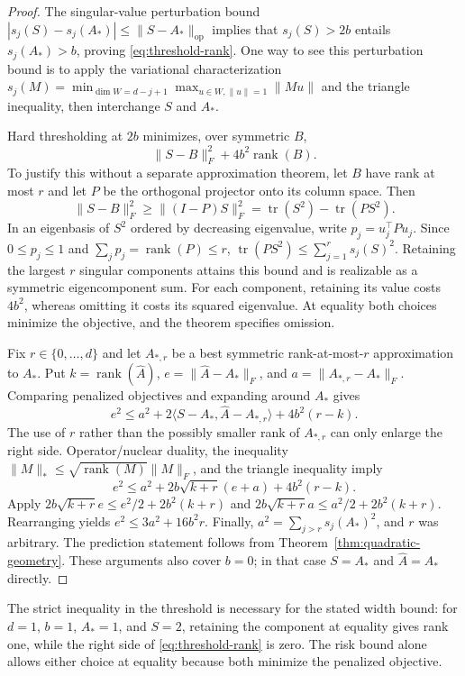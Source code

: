 \begin{proof}
The singular-value perturbation bound
$|s_j(S)-s_j(A_*)|\leq\|S-A_*\|_{\mathrm{op}}$ implies that
$s_j(S)>2b$ entails $s_j(A_*)>b$, proving
\eqref{eq:threshold-rank}. One way to see this perturbation bound is to
apply the variational characterization
$s_j(M)=\min_{\dim W=d-j+1}\max_{u\in W,\|u\|=1}\|Mu\|$
and the triangle inequality, then interchange $S$ and $A_*$.

Hard thresholding at $2b$ minimizes, over symmetric $B$,
\[
 \|S-B\|_F^2+4b^2\operatorname{rank}(B).
\]
To justify this without a separate approximation theorem, let $B$ have
rank at most $r$ and let $P$ be the orthogonal projector onto its column
space. Then
\[
 \|S-B\|_F^2\geq\|(I-P)S\|_F^2
 =\operatorname{tr}(S^2)-\operatorname{tr}(PS^2).
\]
In an eigenbasis of $S^2$ ordered by decreasing eigenvalue, write
$p_j=u_j^\top Pu_j$. Since $0\leq p_j\leq1$ and
$\sum_jp_j=\operatorname{rank}(P)\leq r$,
$\operatorname{tr}(PS^2)\leq\sum_{j=1}^r s_j(S)^2$.
Retaining the largest $r$ singular components attains this bound and is
realizable as a symmetric eigencomponent sum. For each component,
retaining its value costs $4b^2$, whereas omitting it costs its squared
eigenvalue. At equality both choices minimize the objective, and the
theorem specifies omission.

Fix $r\in\{0,\ldots,d\}$ and let $A_{*,r}$ be a best symmetric
rank-at-most-$r$ approximation to $A_*$. Put
$k=\operatorname{rank}(\widehat A)$,
$e=\|\widehat A-A_*\|_F$, and
$a=\|A_{*,r}-A_*\|_F$. Comparing penalized objectives and expanding
around $A_*$ gives
\[
 e^2\leq a^2+2\langle S-A_*,\widehat A-A_{*,r}\rangle
                  +4b^2(r-k).
\]
The use of $r$ rather than the possibly smaller rank of $A_{*,r}$ can
only enlarge the right side. Operator/nuclear duality, the inequality
$\|M\|_*\leq\sqrt{\operatorname{rank}(M)}\|M\|_F$, and the triangle
inequality imply
\[
 e^2\leq a^2+2b\sqrt{k+r}(e+a)+4b^2(r-k).
\]
Apply $2b\sqrt{k+r}e\leq e^2/2+2b^2(k+r)$ and
$2b\sqrt{k+r}a\leq a^2/2+2b^2(k+r)$. Rearranging yields
$e^2\leq3a^2+16b^2r$. Finally,
$a^2=\sum_{j>r}s_j(A_*)^2$, and $r$ was arbitrary.
The prediction statement follows from
Theorem~\ref{thm:quadratic-geometry}. These arguments also cover $b=0$;
in that case $S=A_*$ and $\widehat A=A_*$ directly.
\end{proof}

The strict inequality in the threshold is necessary for the stated
width bound: for $d=1$, $b=1$, $A_*=1$, and $S=2$, retaining the component
at equality gives rank one, while the right side of
\eqref{eq:threshold-rank} is zero. The risk bound alone allows either
choice at equality because both minimize the penalized objective.

